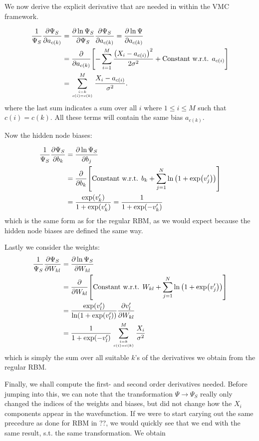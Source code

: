\documentclass[Thesis.tex]{subfiles}
\begin{document}
We now derive the explicit derivative that are needed in within the VMC
framework.

\begin{align}
    \frac{1}{\Psi_S} \pdv{\Psi_S}{a_{c(k)}} &= \pdv{\ln
    \Psi_S}{\Psi_S}\pdv{\Psi_S}{a_{c(k)}} = \pdv{\ln \Psi}{a_{c(k)}}\\
    &= \pdv{}{a_{c(k)}}\qty[ -\sum_{i=1}^M \frac{\qty(X_i -
    a_{c(i)})^2}{2\sigma^2} + \text{Constant w.r.t. } a_{c(i)} ]\\
    &= \sum_{i=k\atop{c(i)=c(k)}}^M \frac{X_i -
    a_{c(i)}}{\sigma^2}.\label{eq:rbm-sym-deriv-a}
\end{align}
where the last sum indicates a sum over all $i$ where $1 \leq i \leq M$ such
that $c(i) = c(k)$. All these terms will contain the same bias $a_{c(k)}$.

Now the hidden node biases:

\begin{align}
    \frac{1}{\Psi_S} \pdv{\Psi_S}{b_k} &= \pdv{\ln\Psi_S}{b_j}\\
    &= \pdv{}{b_k}\qty[\text{Constant w.r.t. }b_k +
    \sum_{j=1}^N\ln\qty(1+\exp(v_j'))]\\
    &= \frac{\exp(v_k')}{1 + \exp(v_k')} = \frac{1}{1 + \exp(-v_k')}\label{eq:rbm-sym-deriv-b}
\end{align}
which is the same form as for the regular RBM, as we would expect because the
hidden node biases are defined the same way.

Lastly we consider the weights:
\begin{align}
    \frac{1}{\Psi_S} \pdv{\Psi_S}{W_{kl}} &= \pdv{\ln\Psi_S}{W_{kl}}\\
    &= \pdv{}{W_{kl}}\qty[\text{Constant w.r.t. }W_{kl} +
    \sum_{j=1}^N\ln\qty(1+\exp(v_j'))]\\
    &= \frac{\exp(v_l')}{\ln(1 + \exp(v_l'))} \pdv{v_l'}{W_{kl}}\\
    &= \frac{1}{1 + \exp(-v_l')}\sum_{i=k\atop{c(i)=c(k)}}^M
    \frac{X_i}{\sigma^2} \label{eq:rbm-sym-deriv-W}
\end{align}
which is simply the sum over all suitable $k$'s of the derivatives we obtain
from the regular RBM.

Finally, we shall compute the first- and second order derivatives needed. Before
jumping into this, we can note that the transformation $\Psi\rightarrow\Psi_S$ really
only changed the indices of the weights and biases, but did not change how the
$X_i$ components appear in the wavefunction. If we were to start carying out the
same precedure as done for RBM in ??, we would quickly see that we end with the
same result, s.t. the same transformation. We obtain
\end{document}
